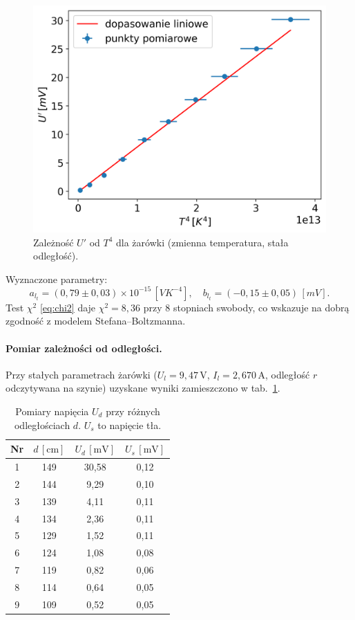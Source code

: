\documentclass[12pt]{article}
\begin{document}
\begin{figure}[H]
	\centering
	\includegraphics[scale=0.6]{boltzman_temp}
	\caption{Zależność $U'$ od $T^4$ dla żarówki (zmienna temperatura, stała odległość).}
	\label{fig:boltzman_temp}
\end{figure}

Wyznaczone parametry:
\[
	a_{l_t} = (0{,}79 \pm 0{,}03) \times 10^{-15}\,[VK^{-4}], 
	\quad 
	b_{l_t} = (-0{,}15 \pm 0{,}05) \,[mV].
\]
Test $\chi^2$ \eqref{eq:chi2} daje $\chi^2=8{,}36$ przy $8$ stopniach swobody, co wskazuje na dobrą zgodność z modelem Stefana–Boltzmanna.

\paragraph{Pomiar zależności od odległości.}
Przy stałych parametrach żarówki ($U_l=9{,}47\,\mathrm{V}$, $I_l=2{,}670\,\mathrm{A}$, odległość $r$ odczytywana na szynie) uzyskane wyniki zamieszczono w tab.~\ref{tab:distance_measurements}.

\begin{table}[H]
	\centering
	\begin{tabular}{c|c|c|c}
		\toprule
		Nr & $d\,[\mathrm{cm}]$ & $U_d\,[\mathrm{mV}]$ & $U_s\,[\mathrm{mV}]$ \\
		\midrule
		1  & 149 & 30{,}58 & 0{,}12 \\
		2  & 144 & 9{,}29  & 0{,}10 \\
		3  & 139 & 4{,}11  & 0{,}11 \\
		4  & 134 & 2{,}36  & 0{,}11 \\
		5  & 129 & 1{,}52  & 0{,}11 \\
		6  & 124 & 1{,}08  & 0{,}08 \\
		7  & 119 & 0{,}82  & 0{,}06 \\
		8  & 114 & 0{,}64  & 0{,}05 \\
		9  & 109 & 0{,}52  & 0{,}05 \\
		\bottomrule
	\end{tabular}
	\caption{Pomiary napięcia $U_d$ przy różnych odległościach $d$. $U_s$ to napięcie tła.}
	\label{tab:distance_measurements}
\end{table}
\end{document}
